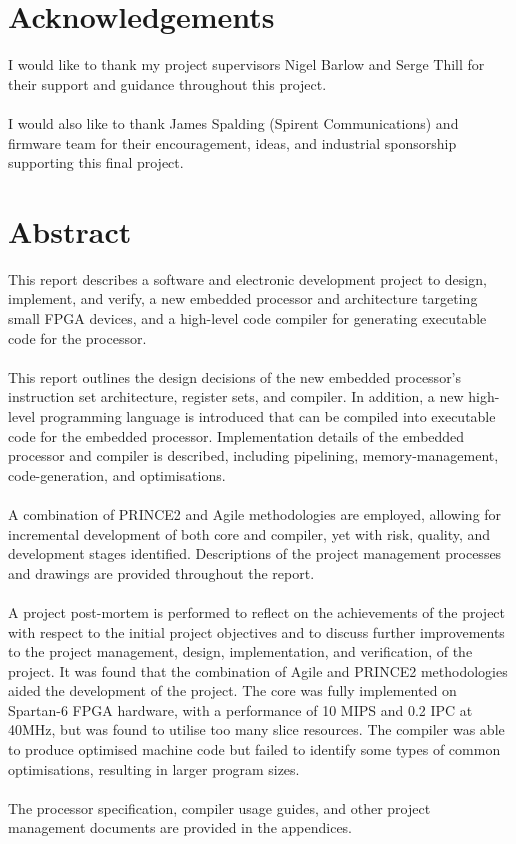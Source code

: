 \documentclass[11pt,a4paper]{report}
\begin{document}
\newpage
\chapter*{Acknowledgements}
I would like to thank my project supervisors Nigel Barlow and Serge Thill for their support and guidance throughout this project. 
\\\\
I would also like to thank James Spalding (Spirent Communications) and firmware team for their encouragement, ideas, and industrial sponsorship supporting this final project.

\newpage
\chapter*{Abstract}
\startcontents[chapters]
\noindent
This report describes a software and electronic development project to design, implement, and verify, a new embedded processor and architecture targeting small FPGA devices, and a high-level code compiler for generating executable code for the processor.
\\\\
This report outlines the design decisions of the new embedded processor's instruction set architecture, register sets, and compiler. In addition, a new high-level programming language is introduced that can be compiled into executable code for the embedded processor. Implementation details of the embedded processor and compiler is described, including pipelining, memory-management, code-generation, and optimisations. 
\\\\
A combination of PRINCE2 and Agile methodologies are employed, allowing for incremental development of both core and compiler, yet with risk, quality, and development stages identified. Descriptions of the project management processes and drawings are provided throughout the report.
\\\\
A project post-mortem is performed to reflect on the achievements of the project with respect to the initial project objectives and to discuss further improvements to the project management, design, implementation, and verification, of the project. It was found that the combination of Agile and PRINCE2 methodologies aided the development of the project. The core was fully implemented on Spartan-6 FPGA hardware, with a performance of 10 MIPS and 0.2 IPC at 40MHz, but was found to utilise too many slice resources. The compiler was able to produce optimised machine code but failed to identify some types of common optimisations, resulting in larger program sizes.
\\\\
The processor specification, compiler usage guides, and other project management  documents are provided in the appendices.
\end{document}
